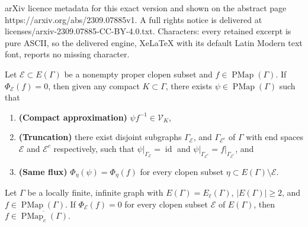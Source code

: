 \documentclass[10pt,a4paper]{amsart}
\def\G{{\Gamma}}
\DeclareMathOperator{\PMap}{PMap}
\newcommand{\cE}{\mathcal{E}}
\newcommand{\cV}{\mathcal{V}}
\DeclareMathOperator{\id}{id}
\begin{document}
arXiv licence metadata for this exact version and shown on the abstract page https://arxiv.org/abs/2309.07885v1. A full rights notice is delivered at licenses/arxiv-2309.07885-CC-BY-4.0.txt. Characters: every retained excerpt is pure ASCII, so the delivered engine, XeLaTeX with its default Latin Modern text font, reports no missing character.
\begin{LEM} \label{lem:zeroflux}
    Let $\cE \subset E(\G)$ be a nonempty proper clopen subset and $f \in \PMap(\G)$. If $\Phi_{\cE}(f) = 0$, then given any compact $K \subset \G$, there exists $\psi \in \PMap(\G)$ such that
    \begin{enumerate}[label=(\roman*)]
        \item \textrm{\bf (Compact approximation)} 
            $\psi f^{-1} \in \cV_{K}$,
        \item \textrm{\bf (Truncation)} there exist disjoint subgraphs $\G_{\cE}$, and $\G_{\cE^{c}}$ of $\G$ with end spaces $\cE$ and $\cE^{c}$ respectively, such that 
            $\psi\vert_{\G_{\cE}} = \id$ and $\psi\vert_{\G_{\cE^{c}}} = f\vert_{\G_{\cE^{c}}}$, and
        \item \textrm{\bf (Same flux)}
            $\Phi_{\eta}(\psi) = \Phi_{\eta}(f)$ for every clopen subset $\eta \subset E(\G) \setminus \cE$.
    \end{enumerate}
\end{LEM}

\begin{PROP}\label{prop:coregraphcase}
    Let $\G$ be a locally finite, infinite graph with $E(\G) = E_{\ell}(\G)$, $|E(\G)| \geq 2$, and $f \in \PMap(\G)$. If $\Phi_{{\cE}}(f) = 0$ for every clopen subset $\cE$ of $E(\G)$, then $f \in \overline{\PMap_c(\G)}$.
\end{PROP}
\end{document}

